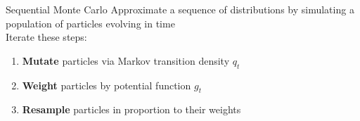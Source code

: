 \documentclass[aspectratio=169]{beamer}
\theoremstyle{definition}
\begin{document}
%


\begin{frame}{Sequential Monte Carlo}
Approximate a sequence of distributions by simulating a population of particles evolving in time\\[10pt]
\pause
Iterate these steps:
\begin{enumerate}
\item \textbf{Mutate} particles via Markov transition density $q_t$
\item \textbf{Weight} particles by potential function $g_t$
\item \textbf{Resample} particles in proportion to their weights
\end{enumerate}
\end{frame}
\end{document}
